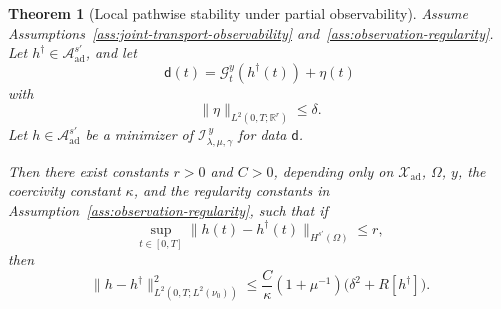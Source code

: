 \documentclass{article}
\newtheorem{theorem}{Theorem}[section]
\theoremstyle{definition}
\newcommand{\obsdata}{\mathsf{d}}
\begin{document}
\begin{theorem}[Local pathwise stability under partial observability]
    \label{thm:pathwise-stability}
    Assume Assumptions~\ref{ass:joint-transport-observability}
    and~\ref{ass:observation-regularity}. Let
    \(h^\dagger\in \mathcal A_{\mathrm{ad}}^{s'}\), and let
    \[
        \obsdata(t)=\mathcal G_t^y(h^\dagger(t))+\eta(t)
    \]
    with
    \[
        \|\eta\|_{L^2(0,T;\mathbb R^r)}\le\delta.
    \]
    Let \(h\in\mathcal A_{\mathrm{ad}}^{s'}\) be a minimizer
    of \(\mathcal I_{\lambda,\mu,\gamma}^{\,y}\) for data \(\obsdata\).

    Then there exist constants \(r>0\) and \(C>0\), depending only on
    \(\mathcal X_{\mathrm{ad}}\), \(\Omega\), \(y\), the coercivity constant \(\kappa\), and
    the regularity constants in Assumption~\ref{ass:observation-regularity}, such that if
    \begin{equation}
        \label{eq:proximity-condition}
        \sup_{t\in[0,T]}\|h(t)-h^\dagger(t)\|_{H^{s'}(\Omega)}\le r,
    \end{equation}
    then
    \begin{equation}
        \label{eq:pathwise-stability-estimate}
        \|h-h^\dagger\|_{L^2(0,T;L^2(\nu_0))}^2
        \le
        \frac{C}{\kappa}(1+\mu^{-1})
        \Big(
        \delta^2+R[h^\dagger]
        \Big).
    \end{equation}
\end{theorem}
\end{document}
